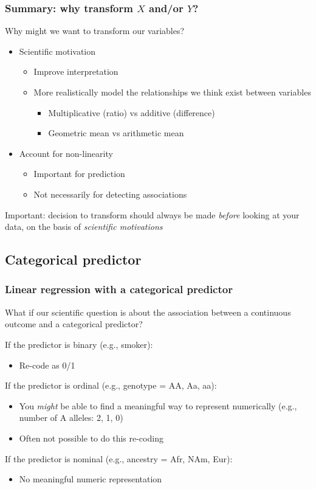\documentclass[12pt, 
hyperref={colorlinks=true, linkcolor=blue, urlcolor=cyan}]{beamer}
\begin{document}
\begin{frame}
\frametitle{Summary: why transform $X$ and/or $Y$?}
Why might we want to transform our variables? \vspace{-0.3cm}
\begin{itemize}
\item Scientific motivation
	\begin{itemize}
	\item Improve interpretation
	\item More realistically model the relationships we think exist between variables
		\begin{itemize}
		\item Multiplicative (ratio) vs additive (difference)
		\item Geometric mean vs arithmetic mean
		\end{itemize}
	\end{itemize}
\item Account for non-linearity 
	\begin{itemize}
	\item Important for prediction
	\item Not necessarily for detecting associations
	\end{itemize}
\end{itemize}

\color{red} Important: \color{black} decision to transform should always be made \textit{before} looking at your data, on the basis of \textit{scientific motivations}
\end{frame}


\subsection{Categorical predictor}
\begin{frame}
\frametitle{Linear regression with a categorical predictor}

What if our scientific question is about the association between a continuous outcome and a categorical predictor?\pause

If the predictor is binary (e.g., smoker):\vspace{-0.3cm}
\begin{itemize}
\item Re-code as 0/1 
\end{itemize}\pause

If the predictor is ordinal (e.g., genotype = AA, Aa, aa): \vspace{-0.3cm}
\begin{itemize}
\item You \textit{might} be able to find a meaningful way to represent numerically (e.g., number of A alleles: 2, 1, 0)
\item Often not possible to do this re-coding
\end{itemize}\pause

If the predictor is nominal (e.g., ancestry = Afr, NAm, Eur):\vspace{-0.3cm}
\begin{itemize}
\item No meaningful numeric representation
\end{itemize}
\end{frame}
\end{document}
